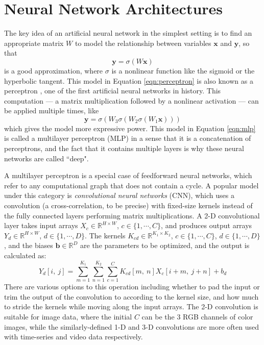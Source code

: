 \section{Neural Network Architectures}

The key idea of an artificial neural network in the simplest setting is to find an appropriate matrix $W$ to model the relationship between variables $\mathbf{x}$ and $\mathbf{y}$, so that
\begin{equation}\label{eqn:perceptron}
	\mathbf{y} = \sigma(W \mathbf{x})
\end{equation}
is a good approximation, where $\sigma$ is a nonlinear function like the sigmoid or the hyperbolic tangent.
This model in Equation \ref{eqn:perceptron} is also known as a perceptron \cite{rosenblatt1957perceptron}, one of the first artificial neural networks in history.
This computation --- a matrix multiplication followed by a nonlinear activation --- can be applied multiple times, like
\begin{equation}\label{eqn:mlp}
	\mathbf{y} = \sigma(W_3\sigma(W_2 \sigma(W_1 \mathbf{x})))
\end{equation}
which gives the model more expressive power.
This model in Equation \ref{eqn:mlp} is called a multilayer perceptron (MLP) in a sense that it is a concatenation of perceptrons, and the fact that it contains multiple layers is why these neural networks are called ``deep".


A multilayer perceptron is a special case of feedforward neural networks, which refer to any computational graph that does not contain a cycle.
A popular model under this category is \emph{convolutional neural networks} (CNN), which uses a convolution (a cross-correlation, to be precise) with fixed-size kernels instead of the fully connected layers performing matrix multiplications.
A 2-D convolutional layer takes input arrays $X_c \in \mathbb{R}^{H \times W}$, $c \in \{ 1, \cdots, C \}$, and produces output arrays $Y_d \in \mathbb{R}^{H \times W}$, $d \in \{ 1, \cdots, D \}$.
The kernels $K_{cd} \in \mathbb{R}^{K_1 \times K_2}$, $c \in \{ 1, \cdots, C \}$, $d \in \{ 1, \cdots, D \}$, and the biases $\mathbf{b} \in \mathbb{R}^D$ are the parameters to be optimized, and the output is calculated as:
\begin{equation}\label{eqn:convnet}
Y_{d}[i,~j] = \sum_{m=1}^{K_1} \sum_{n=1}^{K_2} \sum_{c=1}^C K_{cd}[m,~n] X_c[i+m,~j+n] + b_d
\end{equation}
There are various options to this operation including whether to pad the input or trim the output of the convolution to according to the kernel size, and how much to stride the kernels while moving along the input arrays.
The 2-D convolution is suitable for image data, where the initial $C$ can be the 3 RGB channels of color images, while the similarly-defined 1-D and 3-D convolutions are more often used with time-series and video data respectively.

